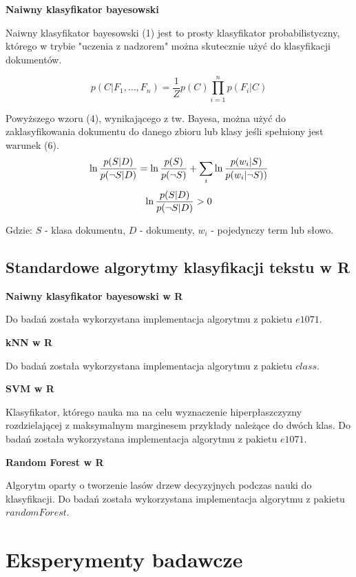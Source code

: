 \documentclass[a4paper, 10pt]{article}
\begin{document}
{\bf{Naiwny klasyfikator bayesowski}}

Naiwny klasyfikator bayesowski (1) jest to prosty klasyfikator probabilistyczny, którego w trybie "uczenia z nadzorem" można skutecznie użyć do 
klasyfikacji dokumentów.

\begin{equation}
p(C \vert F_1,\dots,F_n) = \frac{1}{Z}  p(C) \prod_{i=1}^n p(F_i \vert C)
\end{equation}

Powyższego wzoru (4), wynikającego z tw. Bayesa, można użyć do zaklasyfikowania dokumentu do danego zbioru lub klasy jeśli spełniony jest warunek (6).
\begin{equation}
\ln{p(S\vert D)\over p(\neg S\vert D)}=\ln{p(S)\over p(\neg S)}+\sum_i \ln{p(w_i\vert S)\over p(w_i\vert\neg S))}
\end{equation}
\begin{equation}
\ln{p(S\vert D)\over p(\neg S\vert D)} > 0
\end{equation}

Gdzie: $S$ - klasa dokumentu, $D$ - dokumenty, $w_i$ - pojedynczy term lub słowo.
	

	\subsection{Standardowe algorytmy klasyfikacji tekstu w R}
	
	{\bf{Naiwny klasyfikator bayesowski w R}}
	
	Do badań została wykorzystana implementacja algorytmu z pakietu $e1071$.
	
	{\bf{kNN w R}}
	
	Do badań została wykorzystana implementacja algorytmu z pakietu $class$.
	
	{\bf{SVM w R}}
	
	Klasyfikator, którego nauka ma na celu wyznaczenie hiperpłaszczyzny rozdzielającej z maksymalnym marginesem przykłady należące do dwóch klas.
	Do badań została wykorzystana implementacja algorytmu z pakietu $e1071$.
	
	{\bf{Random Forest w R}}
	
	Algorytm oparty o tworzenie lasów drzew decyzyjnych podczas nauki do klasyfikacji. Do badań została wykorzystana implementacja algorytmu z pakietu $randomForest$.
	
	

\section{Eksperymenty badawcze}
\end{document}
